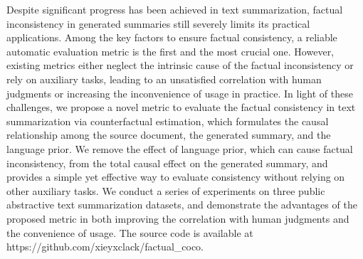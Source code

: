 Despite significant progress has been achieved in text summarization, factual inconsistency in generated summaries still severely limits its practical applications. Among the key factors to ensure factual consistency, a reliable automatic evaluation metric is the first and the most crucial one. However, existing metrics either neglect the intrinsic cause of the factual inconsistency or rely on auxiliary tasks, leading to an unsatisfied correlation with human judgments or increasing the inconvenience of usage in practice. In light of these challenges, we propose a novel metric to evaluate the factual consistency in text summarization via counterfactual estimation, which formulates the causal relationship among the source document, the generated summary, and the language prior. We remove the effect of language prior, which can cause factual inconsistency, from the total causal effect on the generated summary, and provides a simple yet effective way to evaluate consistency without relying on other auxiliary tasks. We conduct a series of experiments on three public abstractive text summarization datasets, and demonstrate the advantages of the proposed metric in both improving the correlation with human judgments and the convenience of usage. The source code is available at https://github.com/xieyxclack/factual\_coco.
